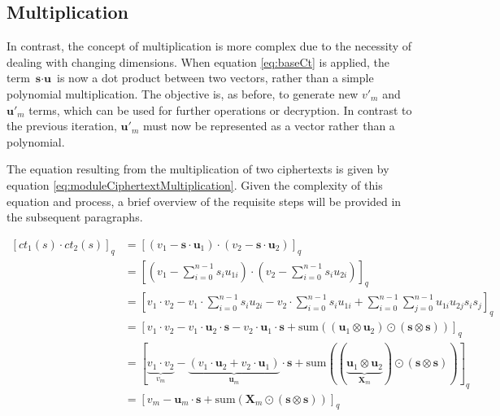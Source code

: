 \subsection*{Multiplication}

In contrast, the concept of multiplication is more complex due to the necessity of dealing with changing dimensions. When equation \ref{eq:baseCt} is applied, the term $\textbf{s}\cdot \textbf{u}$ is now a dot product between two vectors, rather than a simple polynomial multiplication. The objective is, as before, to generate new $v'_m$ and $\textbf{u}'_m$ terms, which can be used for further operations or decryption. In contrast to the previous iteration, $\textbf{u}'_m$ must now be represented as a vector rather than a polynomial.

The equation resulting from the multiplication of two ciphertexts is given by equation \ref{eq:moduleCiphertextMultiplication}. Given the complexity of this equation and process, a brief overview of the requisite steps will be provided in the subsequent paragraphs.

\begin{equation}
  \begin{split}
    [ct_1(s)\cdot ct_2(s)]_q & = [(v_1-\textbf{s}\cdot \textbf{u}_1) \cdot (v_2-\textbf{s}\cdot \textbf{u}_2)]_q                                                                                                                                                                       \\
                             & = [(v_1-\sum_{i=0}^{n-1}s_iu_{1i}) \cdot (v_2-\sum_{i=0}^{n-1}s_iu_{2i})]_q                                                                                                                                                                             \\
                             & = [v_1\cdot v_2 - v_1\cdot \sum_{i=0}^{n-1}s_iu_{2i}- v_2\cdot \sum_{i=0}^{n-1}s_iu_{1i} + \sum_{i=0}^{n-1}\sum_{j=0}^{n-1}u_{1i}u_{2j}s_is_j]_q                                                                                                        \\    
                             & = [v_1\cdot v_2 - v_1\cdot \textbf{u}_2\cdot \textbf{s} - v_2\cdot \textbf{u}_1\cdot \textbf{s} + \mathrm{sum}((\textbf{u}_{1}\otimes\textbf{u}_{2})\odot(\textbf{s}\otimes\textbf{s}))]_q                                                              \\
                             & = [\underbrace{v_1\cdot v_2}_{v_m} - \underbrace{(v_1\cdot \textbf{u}_2 + v_2\cdot \textbf{u}_1)}_{\textbf{u}_m}\cdot \textbf{s} + \mathrm{sum}((\underbrace{\textbf{u}_{1}\otimes\textbf{u}_{2}}_{\textbf{X}_m})\odot(\textbf{s}\otimes\textbf{s}))]_q \\
                             & = [v_m - \textbf{u}_m\cdot \textbf{s} + \mathrm{sum}(\textbf{X}_m\odot(\textbf{s}\otimes\textbf{s}))]_q
  \end{split}
  \label{eq:moduleCiphertextMultiplication}
\end{equation}

